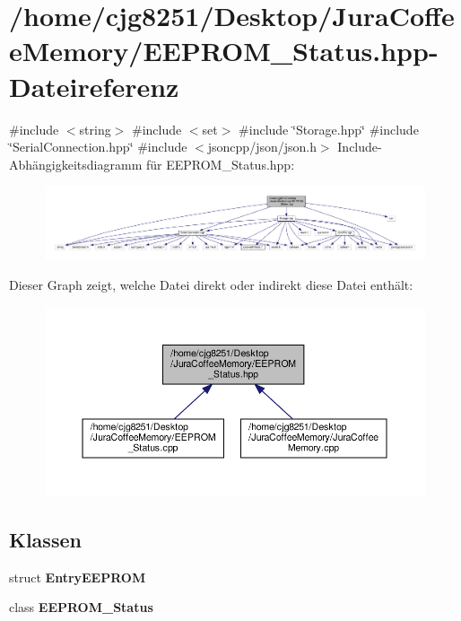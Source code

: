 \section{/home/cjg8251/\+Desktop/\+Jura\+Coffee\+Memory/\+E\+E\+P\+R\+O\+M\+\_\+\+Status.hpp-\/\+Dateireferenz}
\label{_e_e_p_r_o_m___status_8hpp}
{\ttfamily \#include $<$string$>$}\newline
{\ttfamily \#include $<$set$>$}\newline
{\ttfamily \#include \char`\"{}Storage.\+hpp\char`\"{}}\newline
{\ttfamily \#include \char`\"{}Serial\+Connection.\+hpp\char`\"{}}\newline
{\ttfamily \#include $<$jsoncpp/json/json.\+h$>$}\newline
Include-\/\+Abhängigkeitsdiagramm für E\+E\+P\+R\+O\+M\+\_\+\+Status.\+hpp\+:
\nopagebreak
\begin{figure}[H]
\begin{center}
\leavevmode
\includegraphics[width=350pt]{_e_e_p_r_o_m___status_8hpp__incl}
\end{center}
\end{figure}
Dieser Graph zeigt, welche Datei direkt oder indirekt diese Datei enthält\+:
\nopagebreak
\begin{figure}[H]
\begin{center}
\leavevmode
\includegraphics[width=350pt]{_e_e_p_r_o_m___status_8hpp__dep__incl}
\end{center}
\end{figure}
\subsection*{Klassen}
\begin{DoxyCompactItemize}
\item 
struct \textbf{ Entry\+E\+E\+P\+R\+OM}
\item 
class \textbf{ E\+E\+P\+R\+O\+M\+\_\+\+Status}
\end{DoxyCompactItemize}
